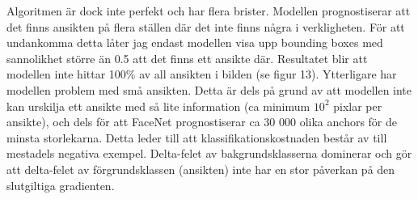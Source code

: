 \documentclass[a4paper,11pt,twoside]{article}
\begin{document}
Algoritmen är dock inte perfekt och har flera brister. Modellen prognostiserar att det finns ansikten på flera ställen där det inte finns några i verkligheten. För att undankomma detta låter jag endast modellen visa upp bounding boxes med sannolikhet större än 0.5 att det finns ett ansikte där. Resultatet blir att modellen inte hittar 100\% av all ansikten i bilden (se figur 13). Ytterligare har modellen problem med små ansikten. Detta är dels på grund av att modellen inte kan urskilja ett ansikte med så lite information (ca minimum $10^2$ pixlar per ansikte), och dels för att FaceNet prognostiserar ca 30 000 olika anchors för de minsta storlekarna. Detta leder till att klassifikationskostnaden består av till mestadels negativa exempel. Delta-felet av bakgrundsklasserna dominerar och gör att delta-felet av förgrundsklassen (ansikten) inte har en stor påverkan på den slutgiltiga gradienten.
\end{document}

